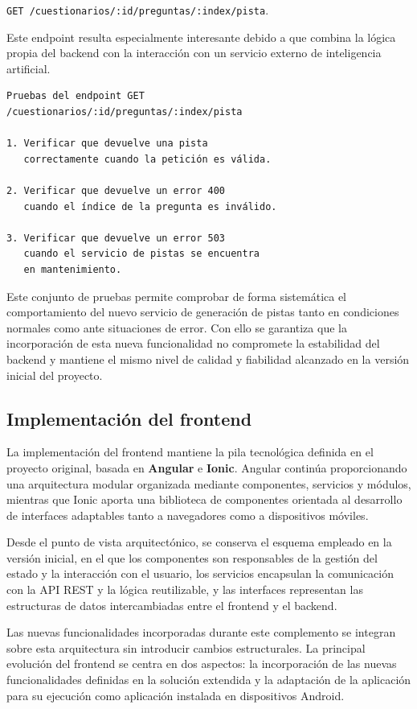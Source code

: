 \texttt{GET /cuestionarios/:id/preguntas/:index/pista}. 

Este endpoint resulta especialmente interesante debido a que combina la lógica propia del backend con la interacción con un servicio externo de inteligencia artificial.

\begin{Verbatim}[frame=single, fontsize=\small]
Pruebas del endpoint GET
/cuestionarios/:id/preguntas/:index/pista

1. Verificar que devuelve una pista
   correctamente cuando la petición es válida.

2. Verificar que devuelve un error 400
   cuando el índice de la pregunta es inválido.

3. Verificar que devuelve un error 503
   cuando el servicio de pistas se encuentra
   en mantenimiento.
\end{Verbatim}

Este conjunto de pruebas permite comprobar de forma sistemática el comportamiento del nuevo servicio de generación de pistas tanto en condiciones normales como ante situaciones de error. Con ello se garantiza que la incorporación de esta nueva funcionalidad no compromete la estabilidad del backend y mantiene el mismo nivel de calidad y fiabilidad alcanzado en la versión inicial del proyecto.

\subsection{Implementación del frontend}
\label{sec:frontend_impl}

La implementación del frontend mantiene la pila tecnológica definida en el proyecto original, basada en \textbf{Angular} e \textbf{Ionic}. Angular continúa proporcionando una arquitectura modular organizada mediante componentes, servicios y módulos, mientras que Ionic aporta una biblioteca de componentes orientada al desarrollo de interfaces adaptables tanto a navegadores como a dispositivos móviles.

Desde el punto de vista arquitectónico, se conserva el esquema empleado en la versión inicial, en el que los componentes son responsables de la gestión del estado y la interacción con el usuario, los servicios encapsulan la comunicación con la API REST y la lógica reutilizable, y las interfaces representan las estructuras de datos intercambiadas entre el frontend y el backend.

Las nuevas funcionalidades incorporadas durante este complemento se integran sobre esta arquitectura sin introducir cambios estructurales. La principal evolución del frontend se centra en dos aspectos: la incorporación de las nuevas funcionalidades definidas en la solución extendida y la adaptación de la aplicación para su ejecución como aplicación instalada en dispositivos Android.

